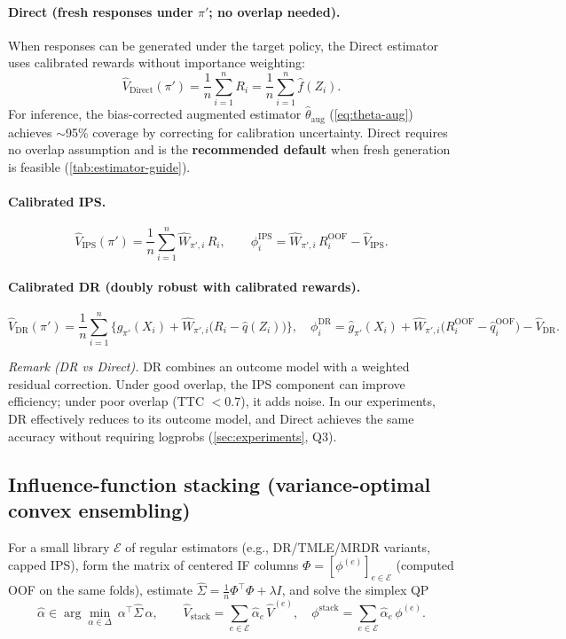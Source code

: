 \paragraph{Direct (fresh responses under $\pi'$; no overlap needed).}
When responses can be generated under the target policy, the Direct estimator uses calibrated rewards without importance weighting:
\[
\widehat V_{\mathrm{Direct}}(\pi') = \frac{1}{n}\sum_{i=1}^n R_i = \frac{1}{n}\sum_{i=1}^n \hat f(Z_i).
\]
For inference, the bias-corrected augmented estimator $\hat\theta_{\mathrm{aug}}$ (\cref{eq:theta-aug}) achieves ${\sim}$95\% coverage by correcting for calibration uncertainty.
Direct requires no overlap assumption and is the \textbf{recommended default} when fresh generation is feasible (\cref{tab:estimator-guide}).

\paragraph{Calibrated IPS.}
\[
\widehat V_{\mathrm{IPS}}(\pi')=\frac{1}{n}\sum_{i=1}^n \hat W_{\pi',i}\,R_i,\qquad
\phi^{\mathrm{IPS}}_i=\hat W_{\pi',i}\,R^{\mathrm{OOF}}_i-\widehat V_{\mathrm{IPS}}.
\]

\paragraph{Calibrated DR (doubly robust with calibrated rewards).}
\[
\widehat V_{\mathrm{DR}}(\pi')
=\frac{1}{n}\sum_{i=1}^n\Big\{\hat g_{\pi'}(X_i)+\hat W_{\pi',i}\big(R_i-\hat q(Z_i)\big)\Big\},
\quad
\phi^{\mathrm{DR}}_i=\hat g_{\pi'}(X_i)+\hat W_{\pi',i}\big(R^{\mathrm{OOF}}_i-\hat q^{\mathrm{OOF}}_i\big)-\widehat V_{\mathrm{DR}}.
\]

\emph{Remark (DR vs Direct).} DR combines an outcome model with a weighted residual correction. Under good overlap, the IPS component can improve efficiency; under poor overlap (TTC $< 0.7$), it adds noise. In our experiments, DR effectively reduces to its outcome model, and Direct achieves the same accuracy without requiring logprobs (\cref{sec:experiments}, Q3).

\subsection{Influence-function stacking (variance-optimal convex ensembling)}
\label{ssec:method-stack}
For a small library $\mathcal{E}$ of regular estimators (e.g., DR/TMLE/MRDR variants, capped IPS), form
the matrix of centered IF columns $\Phi=[\phi^{(e)}]_{e\in\mathcal{E}}$ (computed OOF on the same folds),
estimate $\hat\Sigma=\tfrac{1}{n}\Phi^\top\Phi+\lambda I$, and solve the simplex QP
\[
\hat\alpha\in\arg\min_{\alpha\in\Delta}\ \alpha^\top \hat\Sigma\,\alpha,\qquad
\widehat V_{\mathrm{stack}}=\sum_{e\in\mathcal{E}}\hat\alpha_e\,\widehat V^{(e)},\quad
\phi^{\mathrm{stack}}=\sum_{e\in\mathcal{E}} \hat\alpha_e\,\phi^{(e)}.
\]

